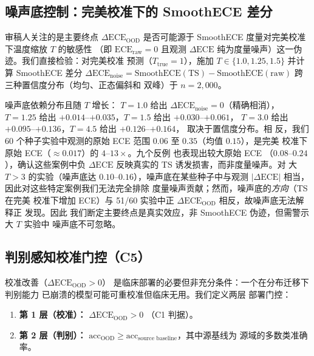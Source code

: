 \subsection{噪声底控制：完美校准下的 SmoothECE 差分}
\label{sec:noise_floor}
审稿人关注的是主要终点
$\Delta\text{ECE}_{\text{OOD}}$ 是否可能源于 SmoothECE
度量对完美校准下温度缩放 $T$ 的敏感性
（即 $\text{ECE}_{\text{raw}} = 0$ 且观测 $\Delta\text{ECE}$
纯为度量噪声）这一伪迹。我们直接检验：对完美校准
预测（$T_{\text{true}}=1$），施加 $T \in \{1.0, 1.25, 1.5\}$
并计算 SmoothECE 差分
$\Delta\text{ECE}_{\text{noise}} = \text{SmoothECE}(\text{TS}) - \text{SmoothECE}(\text{raw})$
跨三种置信度分布（均匀、正态偏斜和
双峰）于 $n=2{,}000$。

噪声底依赖分布且随 $T$ 增长：
$T=1.0$ 给出 $\Delta\text{ECE}_{\text{noise}} = 0$（精确相消），
$T=1.25$ 给出 $+0.014$--$+0.035$，$T=1.5$ 给出 $+0.030$--$+0.061$，
$T=3.0$ 给出 $+0.095$--$+0.136$，$T=4.5$ 给出 $+0.126$--$+0.164$，
取决于置信度分布。相
反，我们 60 个种子实验中观测的原始 ECE 范围
$0.06$ 至 $0.35$（均值 $0.15$），是完美
校准下原始 ECE（$\approx 0.017$）的 $4$--$13\times$。九个反例
也表现出较大原始 ECE
（$0.08$--$0.24$），确认这些案例中负 $\Delta\text{ECE}$
反映真实的 TS 诱发损害，而非度量噪声。对
大 $T > 3$ 的实验（噪声底达
$0.10$--$0.16$），噪声底在某些种子中与观测
$|\Delta\text{ECE}|$ 相当，因此对这些特定案例我们无法完全排除
度量噪声贡献；然而，噪声底的\emph{方向}（TS 在完美
校准下增加 ECE）与 51/60 实验中正 $\Delta\text{ECE}_{\text{OOD}}$
相反，故噪声底无法解释正
发现。因此
我们断定主要终点是真实效应，非
SmoothECE 伪迹，但需警示大 $T$ 实验中
噪声底不可忽略。

\subsection{判别感知校准门控（C5）}
\label{sec:gate}
校准改善（$\Delta\text{ECE}_{\text{OOD}} > 0$）
是临床部署的必要但非充分条件：一个在分布迁移下判别能力
已崩溃的模型可能可重校准但临床无用。我们定义两层
部署门控：
\begin{enumerate}
    \item \textbf{第 1 层（校准）：} $\Delta\text{ECE}_{\text{OOD}} > 0$
    （C1 判据）。
    \item \textbf{第 2 层（判别）：} $\text{acc}_{\text{OOD}} \geq
    \text{acc}_{\text{source baseline}}$，其中源基线为
    源域的多数类准确率。
\end{enumerate}

